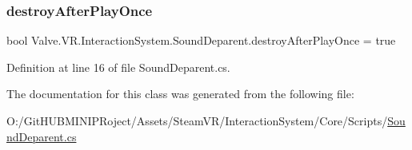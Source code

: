 \subsubsection{\texorpdfstring{destroyAfterPlayOnce}{destroyAfterPlayOnce}}
{\footnotesize\ttfamily bool Valve.\+V\+R.\+Interaction\+System.\+Sound\+Deparent.\+destroy\+After\+Play\+Once = true}



Definition at line 16 of file Sound\+Deparent.\+cs.



The documentation for this class was generated from the following file\+:\begin{DoxyCompactItemize}
\item 
O\+:/\+Git\+H\+U\+B\+M\+I\+N\+I\+P\+Roject/\+Assets/\+Steam\+V\+R/\+Interaction\+System/\+Core/\+Scripts/\mbox{\hyperlink{_sound_deparent_8cs}{Sound\+Deparent.\+cs}}\end{DoxyCompactItemize}
